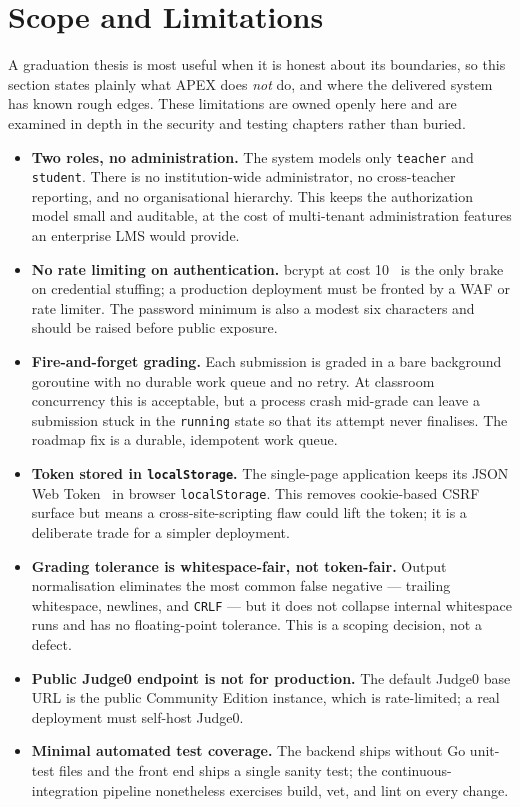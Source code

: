 \section{Scope and Limitations}

A graduation thesis is most useful when it is honest about its boundaries, so
this section states plainly what APEX does \emph{not} do, and where the
delivered system has known rough edges. These limitations are owned openly here
and are examined in depth in the security and testing chapters rather than
buried.

\begin{itemize}
  \item \textbf{Two roles, no administration.} The system models only
  \texttt{teacher} and \texttt{student}. There is no institution-wide
  administrator, no cross-teacher reporting, and no organisational hierarchy.
  This keeps the authorization model small and auditable, at the cost of
  multi-tenant administration features an enterprise LMS would provide.

  \item \textbf{No rate limiting on authentication.} bcrypt at cost
  10~\cite{provos1999bcrypt} is the only brake on credential stuffing; a
  production deployment must be fronted by a WAF or rate limiter. The password
  minimum is also a modest six characters and should be raised before public
  exposure.

  \item \textbf{Fire-and-forget grading.} Each submission is graded in a bare
  background goroutine with no durable work queue and no retry. At classroom
  concurrency this is acceptable, but a process crash mid-grade can leave a
  submission stuck in the \texttt{running} state so that its attempt never
  finalises. The roadmap fix is a durable, idempotent work queue.

  \item \textbf{Token stored in \texttt{localStorage}.} The single-page
  application keeps its JSON Web Token~\cite{rfc7519} in browser
  \texttt{localStorage}. This removes cookie-based CSRF surface but means a
  cross-site-scripting flaw could lift the token; it is a deliberate trade for
  a simpler deployment.

  \item \textbf{Grading tolerance is whitespace-fair, not token-fair.} Output
  normalisation eliminates the most common false negative --- trailing
  whitespace, newlines, and \texttt{CRLF} --- but it does not collapse internal
  whitespace runs and has no floating-point tolerance. This is a scoping
  decision, not a defect.

  \item \textbf{Public Judge0 endpoint is not for production.} The default
  Judge0 base URL is the public Community Edition instance, which is
  rate-limited; a real deployment must self-host Judge0.

  \item \textbf{Minimal automated test coverage.} The backend ships without
  Go unit-test files and the front end ships a single sanity test; the
  continuous-integration pipeline nonetheless exercises build, vet, and lint on
  every change.
\end{itemize}


